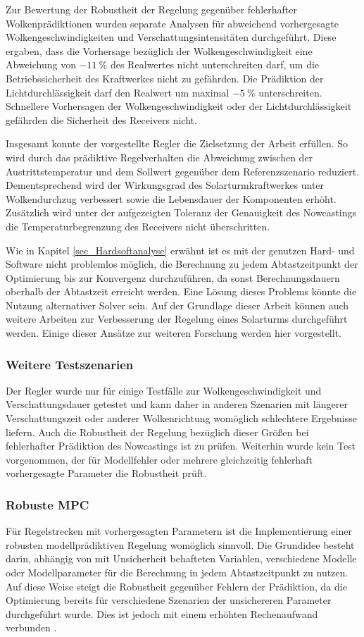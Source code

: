 Zur Bewertung der Robustheit der Regelung gegenüber fehlerhafter Wolkenprädiktionen wurden separate Analysen für abweichend vorhergesagte Wolkengeschwindigkeiten und Verschattungsintensitäten durchgeführt.
Diese ergaben, dass die Vorhersage bezüglich der Wolkengeschwindigkeit eine Abweichung von $\SI{-11}{\percent}$ des Realwertes nicht unterschreiten darf, um die Betriebssicherheit des Kraftwerkes nicht zu gefährden.
Die Prädiktion der Lichtdurchlässigkeit darf den Realwert um maximal $\SI{-5}{\percent}$ unterschreiten.
Schnellere Vorhersagen der Wolkengeschwindigkeit oder der Lichtdurchlässigkeit gefährden die Sicherheit des Receivers nicht.

Insgesamt konnte der vorgestellte Regler die Zielsetzung der Arbeit erfüllen.
So wird durch das prädiktive Regelverhalten die Abweichung zwischen der Austrittstemperatur und dem Sollwert gegenüber dem Referenzszenario reduziert.
Dementsprechend wird der Wirkungsgrad des Solarturmkraftwerkes unter Wolkendurchzug verbessert sowie die Lebensdauer der Komponenten erhöht.
Zusätzlich wird unter der aufgezeigten Toleranz der Genauigkeit des Nowcastings die Temperaturbegrenzung des Receivers nicht überschritten.

Wie in Kapitel \ref{sec_Hardsoftanalyse} erwähnt ist es mit der genutzen Hard- und Software nicht problemlos möglich, die Berechnung zu jedem Abtastzeitpunkt der Optimierung bis zur Konvergenz durchzuführen, da sonst Berechnungsdauern oberhalb der Abtastzeit erreicht werden.
Eine Lösung dieses Problems könnte die Nutzung alternativer Solver sein.
Auf der Grundlage dieser Arbeit können auch weitere Arbeiten zur Verbesserung der Regelung eines Solarturms durchgeführt werden.
Einige dieser Ansätze zur weiteren Forschung werden hier vorgestellt.

\subsubsection*{Weitere Testszenarien}
Der Regler wurde nur für einige Testfälle zur Wolkengeschwindigkeit und Verschattungsdauer getestet und kann daher in anderen Szenarien mit längerer Verschattungszeit oder anderer Wolkenrichtung womöglich schlechtere Ergebnisse liefern.
Auch die Robustheit der Regelung bezüglich dieser Größen bei fehlerhafter Prädiktion des Nowcastings ist zu prüfen.
Weiterhin wurde kein Test vorgenommen, der für Modellfehler oder mehrere gleichzeitig fehlerhaft vorhergesagte Parameter die Robustheit prüft.

\subsubsection*{Robuste MPC}
Für Regelstrecken mit vorhergesagten Parametern ist die Implementierung einer robusten modellprädiktiven Regelung womöglich sinnvoll.
Die Grundidee besteht darin, abhängig von mit Unsicherheit behafteten Variablen, verschiedene Modelle oder Modellparameter für die Berechnung in jedem Abtastzeitpunkt zu nutzen.
Auf diese Weise steigt die Robustheit gegenüber Fehlern der Prädiktion, da die Optimierung bereits für verschiedene Szenarien der unsichereren Parameter durchgeführt wurde.
Dies ist jedoch mit einem erhöhten Rechenaufwand verbunden \cite[S.6ff]{Schwenzer}.

